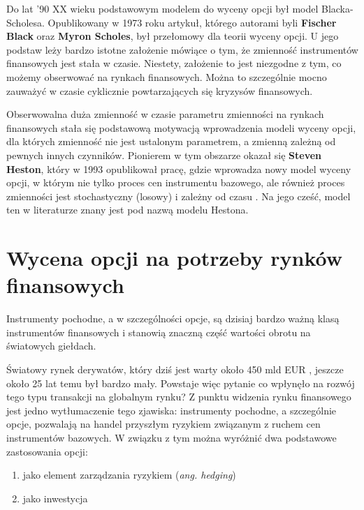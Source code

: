 \documentclass{pracamgr}
\begin{document}
Do lat '90 XX wieku podstawowym modelem do wyceny opcji był model Blacka-Scholesa. Opublikowany w 
1973  \cite{BlackScholes} roku artykuł, którego autorami 
byli \textbf{Fischer Black} oraz \textbf{Myron Scholes},
był przełomowy dla teorii wyceny opcji.
U jego podstaw leży bardzo istotne założenie mówiące o tym, że zmienność instrumentów finansowych 
jest stała w czasie. 
Niestety, założenie to jest niezgodne z tym, co możemy obserwować na rynkach finansowych. 
Można to szczególnie mocno zauważyć w czasie cyklicznie powtarzających się kryzysów finansowych.

Obserwowalna duża zmienność w czasie parametru zmienności na rynkach finansowych stała się podstawową 
motywacją wprowadzenia modeli wyceny
opcji, dla których zmienność nie jest ustalonym parametrem, a zmienną zależną od pewnych innych 
czynników. Pionierem w tym obszarze okazał się \textbf{Steven Heston}, który w 
1993 opublikował pracę, gdzie wprowadza
nowy model wyceny opcji, w którym nie tylko proces cen instrumentu bazowego, ale również
proces zmienności jest stochastyczny (losowy) i zależny od czasu  \cite{Heston}. Na jego cześć, model ten w literaturze znany jest pod nazwą modelu Hestona.
 

\section{Wycena opcji na potrzeby rynków finansowych} %

Instrumenty pochodne, a w szczególności opcje, są dzisiaj bardzo ważną klasą instrumentów finansowych 
i stanowią znaczną część wartości obrotu na światowych giełdach.

Światowy rynek derywatów, który dziś jest warty około 450 mld EUR  \cite{GlobalDerMarket}, jeszcze 
około 25 lat temu był bardzo mały. Powstaje więc pytanie co wpłynęło na rozwój tego typu transakcji 
na globalnym rynku? Z punktu widzenia rynku finansowego jest jedno wytłumaczenie tego zjawiska:
instrumenty pochodne, a szczególnie opcje, pozwalają na handel przyszłym ryzykiem związanym z ruchem 
cen instrumentów bazowych. W związku z tym można wyróżnić dwa podstawowe 
zastosowania opcji: 

\begin{enumerate}
  \item jako element zarządzania ryzykiem (\textit{ang. hedging})
  \item jako inwestycja 
\end{enumerate}
\end{document}
